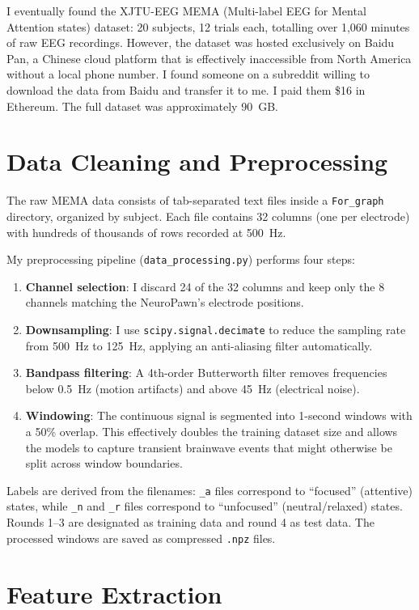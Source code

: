 \documentclass[12pt]{article}
\begin{document}
I eventually found the XJTU-EEG MEMA (Multi-label EEG for Mental Attention states) dataset: 20 subjects, 12 trials each, totalling over 1,060 minutes of raw EEG recordings. However, the dataset was hosted exclusively on Baidu Pan, a Chinese cloud platform that is effectively inaccessible from North America without a local phone number. I found someone on a subreddit willing to download the data from Baidu and transfer it to me. I paid them \$16 in Ethereum. The full dataset was approximately 90~GB.

\section{Data Cleaning and Preprocessing}

The raw MEMA data consists of tab-separated text files inside a \texttt{For\_graph} directory, organized by subject. Each file contains 32 columns (one per electrode) with hundreds of thousands of rows recorded at 500~Hz.

My preprocessing pipeline (\texttt{data\_processing.py}) performs four steps:
\begin{enumerate}
    \item \textbf{Channel selection}: I discard 24 of the 32 columns and keep only the 8 channels matching the NeuroPawn's electrode positions.
    \item \textbf{Downsampling}: I use \texttt{scipy.signal.decimate} to reduce the sampling rate from 500~Hz to 125~Hz, applying an anti-aliasing filter automatically.
    \item \textbf{Bandpass filtering}: A 4th-order Butterworth filter removes frequencies below 0.5~Hz (motion artifacts) and above 45~Hz (electrical noise).
    \item \textbf{Windowing}: The continuous signal is segmented into 1-second windows with a 50\% overlap. This effectively doubles the training dataset size and allows the models to capture transient brainwave events that might otherwise be split across window boundaries.
\end{enumerate}

Labels are derived from the filenames: \texttt{\_a} files correspond to ``focused'' (attentive) states, while \texttt{\_n} and \texttt{\_r} files correspond to ``unfocused'' (neutral/relaxed) states. Rounds 1--3 are designated as training data and round 4 as test data. The processed windows are saved as compressed \texttt{.npz} files.

\section{Feature Extraction}
\end{document}
